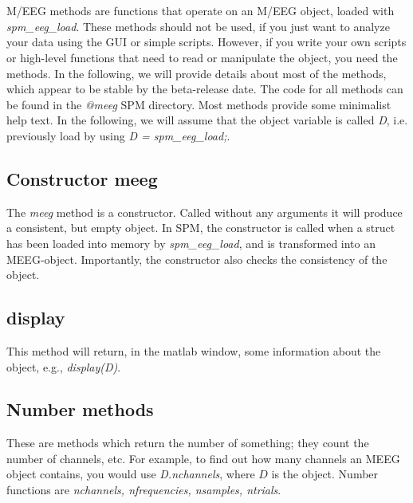 \\
\\
M/EEG methods are functions that operate on an M/EEG object, loaded
with \textit{spm\_eeg\_load}. These methods should not be used, if you just
want to analyze your data using the GUI or simple scripts. However, if
you write your own scripts or high-level functions that need to read
or manipulate the object, you need the methods. In the following, we
will provide details about most of the methods, which appear to be
stable by the beta-release date. The code for all methods
can be found in the \textit{@meeg} SPM directory. Most methods provide
some minimalist help text. In the following, we will assume that the
object variable is called \textit{D}, i.e. previously load by using \textit{D
  = spm\_eeg\_load;}.

\subsection{Constructor meeg}
The \textit{meeg} method is a constructor. Called without any arguments it
will produce a consistent, but empty object. In SPM, the constructor
is called when a struct has been loaded into memory by
\textit{spm\_eeg\_load}, and is transformed into an
MEEG-object. Importantly, the constructor also checks the consistency
of the object. 

\subsection{display}
This method will return, in the matlab window, some information about
the object, e.g., \textit{display(D)}. 

\subsection{Number methods}
These are methods which return the number of something; they count the
number of channels, etc. For example, to find out how many channels an
MEEG object contains, you would use \textit{D.nchannels}, where $D$ is the
object. Number functions are \textit{nchannels, nfrequencies, nsamples,
  ntrials}.

